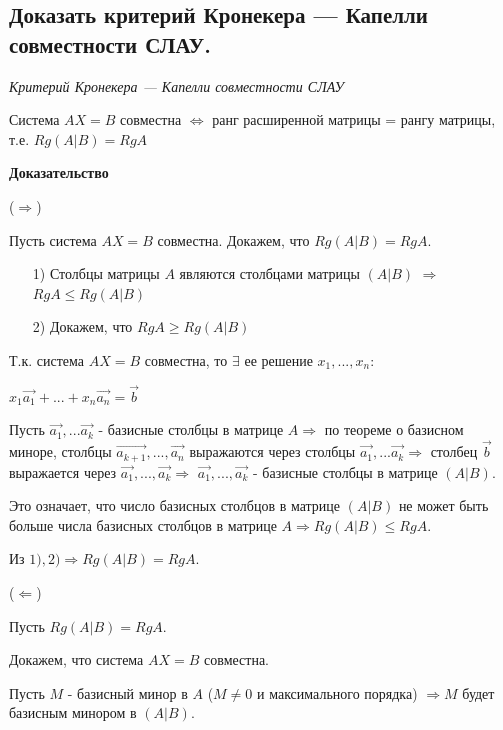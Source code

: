 \ep

\subsection{Доказать критерий Кронекера — Капелли совместности СЛАУ.}
\textit{Критерий Кронекера — Капелли совместности СЛАУ}

\vspace*{15pt}

Система $AX = B$ совместна $\iff$ ранг расширенной матрицы = рангу матрицы, т.е. $Rg(A|B) = RgA$

\vspace*{15pt}

{\bf{Доказательство}}

($\Rightarrow$)  

Пусть система $AX = B$ совместна.
Докажем, что $Rg(A|B) = RgA$.
\begin{enumerate}
    \item [1)] Столбцы матрицы $A$ являются столбцами матрицы $(A|B)$ $\Rightarrow$ $RgA \leqslant Rg(A|B)$
    \item [2)] Докажем, что $RgA \geqslant Rg(A|B)$
\end{enumerate} 


Т.к. система $AX = B$ совместна, то $\exists$ ее решение $x_1, ..., x_n:$

$x_1 \vec{a_1} + ... + x_n \vec{a_n} = \vec{b}$

Пусть $\vec{a_1},...\vec{a_k}$ - базисные столбцы в матрице $A \Rightarrow$ по теореме о базисном миноре, столбцы $\vec{a_{k+1}}, ..., \vec{a_n}$ выражаются через столбцы $\vec{a_1},...\vec{a_k} \Rightarrow$ столбец $\vec{b}$ выражается через $\vec{a_1},... , \vec{a_k} \Rightarrow$ $\vec{a_1},... , \vec{a_k}$ - базисные столбцы в матрице $(A|B)$.

Это означает, что число базисных столбцов в матрице $(A|B)$ не может быть больше числа базисных столбцов в матрице $A \Rightarrow Rg(A|B)\leqslant RgA$.

Из $1), 2) \Rightarrow Rg(A|B) = RgA$.

\vspace*{15pt}

($\Leftarrow$)

Пусть $Rg(A|B) = RgA.$

Докажем, что система $AX = B$ совместна. 

Пусть $M$ - базисный минор в $A$ ($M \ne 0$ и максимального порядка) $\Rightarrow M$ будет базисным минором в $(A|B)$.

